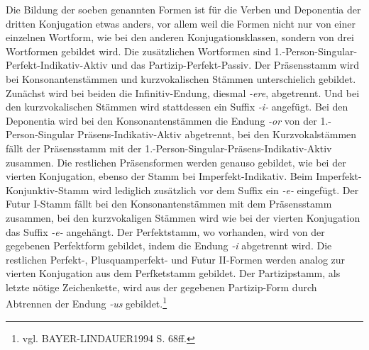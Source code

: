 \documentclass[12pt,abstract=on]{scrreprt}
\begin{document}
Die Bildung der soeben genannten Formen ist für die Verben und Deponentia der dritten Konjugation etwas anders, vor allem weil die Formen nicht nur von einer einzelnen Wortform, wie bei den anderen Konjugationsklassen, sondern von drei Wortformen gebildet wird. Die zusätzlichen Wortformen sind 1.-Person-Singular-Perfekt-Indikativ-Aktiv und das Partizip-Perfekt-Passiv. Der Präsensstamm wird bei Konsonantenstämmen und kurzvokalischen Stämmen unterschielich gebildet. Zunächst wird bei beiden die Infinitiv-Endung, diesmal \textit{-ere}, abgetrennt. Und bei den kurzvokalischen Stämmen wird stattdessen ein Suffix \textit{-i-} angefügt. Bei den Deponentia wird bei den Konsonantenstämmen die Endung \textit{-or} von der 1.-Person-Singular Präsens-Indikativ-Aktiv abgetrennt, bei den Kurzvokalstämmen fällt der Präsensstamm mit der 1.-Person-Singular-Präsens-Indikativ-Aktiv zusammen. Die restlichen Präsensformen werden genauso gebildet, wie bei der vierten Konjugation, ebenso der Stamm bei Imperfekt-Indikativ. Beim Imperfekt-Konjunktiv-Stamm wird lediglich zusätzlich vor dem Suffix ein \textit{-e-} eingefügt. Der Futur I-Stamm fällt bei den Konsonantenstämmen mit dem Präsensstamm zusammen, bei den kurzvokaligen Stämmen wird wie bei der vierten Konjugation das Suffix \textit{-e-} angehängt. Der Perfektstamm, wo vorhanden, wird von der gegebenen Perfektform gebildet, indem die Endung \textit{-i} abgetrennt wird. Die restlichen Perfekt-, Plusquamperfekt- und Futur II-Formen werden analog zur vierten Konjugation aus dem Perfketstamm gebildet. Der Partizipstamm, als letzte nötige Zeichenkette, wird aus der gegebenen Partizip-Form durch Abtrennen der Endung \textit{-us} gebildet.\footnote{vgl. BAYER-LINDAUER1994 S. 68ff.} \par
\end{document}

